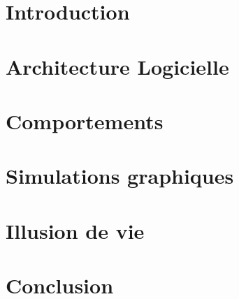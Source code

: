 \documentclass[a4paper,12pt]{article}
\begin{document}

\clearpage
\tableofcontents
\clearpage

\section*{Introduction}


\section{Architecture Logicielle}


\section{Comportements}


\section{Simulations graphiques}


\section{Illusion de vie}


\section{Conclusion}

\end{document}
